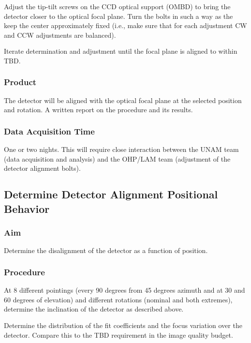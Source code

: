 \documentclass{article}
\begin{document}
Adjust the tip-tilt screws on the CCD optical support (OMBD) to bring the detector closer to the optical focal plane. Turn the bolts in such a way as the keep the center approximately fixed (i.e., make sure that for each adjustment CW and CCW adjustments are balanced).

Iterate determination and adjustment until the focal plane is aligned to within TBD.

\subsubsection{Product}

The detector will be aligned with the optical focal plane at the selected position and rotation. A written report on the procedure and its results.

\subsubsection{Data Acquisition Time}

One or two nights. This will require close interaction between the UNAM team (data acquisition and analysis) and the OHP/LAM team (adjustment of the detector alignment bolts).


\subsection{Determine Detector Alignment Positional Behavior}

\subsubsection{Aim}

Determine the disalignment of the detector as a function of position.

\subsubsection{Procedure}

At 8 different pointings (every 90 degrees from 45 degrees azimuth and at 30 and 60 degrees of elevation) and different rotations (nominal and both extremes), determine the inclination of the detector as described above.

Determine the distribution of the fit coefficients and the focus variation over the detector. Compare this to the TBD requirement in the image quality budget.
\end{document}
